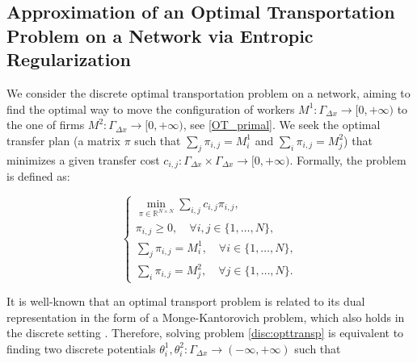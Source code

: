 \documentclass[smallextended,referee,envcountsect,]{svjour3}
\begin{document}
\subsection{Approximation of an Optimal Transportation Problem on a Network via Entropic Regularization}
We consider the discrete optimal transportation problem on a network, aiming to find the optimal way to move the  configuration of workers \(M^1:\Gamma_{\Delta x} \rightarrow [0,+\infty)\) to the one of firms \(M^2:\Gamma_{\Delta x} \rightarrow [0,+\infty)\), see \eqref{OT_primal}. We seek the optimal transfer plan (a matrix \(\pi\) such that \(\sum_{j}\pi_{i,j}=M^1_i\) and \(\sum_{i}\pi_{i,j}=M^2_j\)) that minimizes a given transfer cost \(c_{i,j}:\Gamma_{\Delta x} \times \Gamma_{\Delta x} \rightarrow [0,+\infty)\). Formally, the problem is defined as:

\begin{equation}\label{disc:opttransp}
\left\{
\begin{array}{l}
\min_{\pi \in \mathbb{R}^{N \times N}} \sum_{i,j} c_{i,j} \pi_{i,j} ,\\
\pi_{i,j} \geq 0, \quad \forall i,j \in \{1,\ldots,N\}, \\
\sum_{j} \pi_{i,j} = M^1_i, \quad \forall i \in \{1,\ldots,N\}, \\
\sum_{i} \pi_{i,j} = M^2_j, \quad \forall j \in \{1,\ldots,N\}.
\end{array}
\right.
\end{equation}

It is well-known that an optimal transport problem is related to its dual representation in the form of a Monge-Kantorovich problem, which also holds in the discrete setting \cite{solomon}. Therefore, solving problem \eqref{disc:opttransp} is equivalent to finding two discrete potentials \(\theta^1_i, \theta^2_i:\Gamma_{\Delta x} \rightarrow (-\infty,+\infty)\) such that
\end{document}
